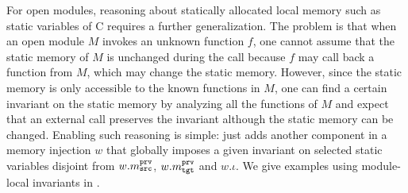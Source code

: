 

\label{sec:overview-verification:injection:static}
%
For open modules, reasoning about statically allocated local memory
such as static variables of C requires a further generalization.  The
problem is that when an open module $M$ invokes an unknown function
$f$, one cannot assume that the static memory of $M$ is unchanged
during the call because $f$ may call back a function from $M$, which
may change the static memory. However, since the static memory is only
accessible to the known functions in $M$, one can find a certain
invariant on the static memory by analyzing all the functions of $M$
and expect that an external call preserves the invariant although the
static memory can be changed. Enabling such reasoning is simple:
\ccm{} just adds another component in a memory injection $w$ that
globally imposes a given invariant on selected static variables
disjoint from $w.m^{\texttt{prv}}_{\texttt{src}}$, $w.m^{\texttt{prv}}_{\texttt{tgt}}$ and $w.\iota$.
We give examples using module-local invariants in .
